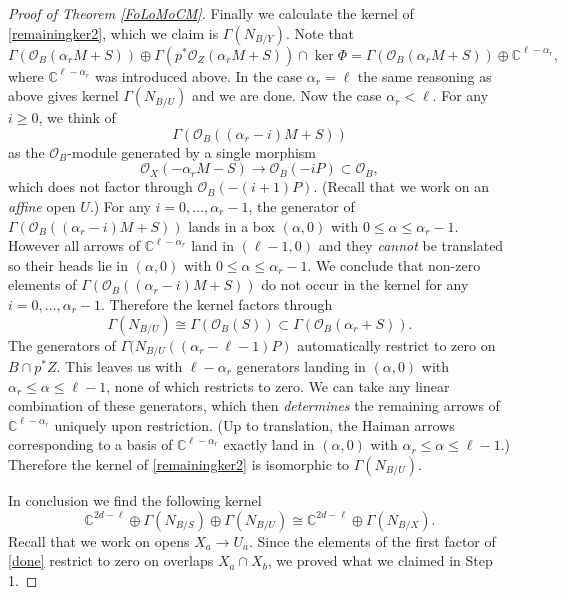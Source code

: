 \documentclass{amsart}
\theoremstyle{definition}
\newcommand{\CC} {\mathbb{C}}          %
\renewcommand{\O}{\mathcal{O}}
\begin{document}
\begin{proof}[Proof of Theorem \ref{FoLoMoCM}]
Finally we calculate the kernel of \eqref{remainingker2}, which we claim is $\Gamma(N_{B/Y})$. Note that 
\[
\Gamma(\O_B(\alpha_r M + S)) \oplus \Gamma(p^* \O_Z(\alpha_r M + S)) \cap \ker \Phi  = \Gamma(\O_B(\alpha_r M + S)) \oplus \CC^{\ell - \alpha_r},
\]
where $\CC^{\ell - \alpha_r}$ was introduced above. In the case $\alpha_r = \ell$ the same reasoning as above gives kernel $\Gamma(N_{B/U})$ and we are done. Now the case $\alpha_r < \ell$. For any $i \geq 0$, we think of
\[
\Gamma(\O_B((\alpha_r - i) M + S))
\] 
as the $\O_B$-module generated by a single morphism 
\[
\O_X(-\alpha_r M - S) \rightarrow \O_B(-i P) \subset \O_B,
\] 
which does not factor through $\O_B(-(i+1)P)$. (Recall that we work on an \emph{affine} open $U$.) For any $i=0, \ldots, \alpha_r-1$, the generator of $\Gamma(\O_B((\alpha_r - i) M + S))$ lands in a box $(\alpha,0)$ with $0 \leq \alpha \leq \alpha_r-1$. However all arrows of $\CC^{\ell - \alpha_r}$ land in $(\ell-1,0)$ and they \emph{cannot} be translated so their heads lie in $(\alpha,0)$ with $0 \leq \alpha \leq \alpha_r-1$. We conclude that non-zero elements of $\Gamma(\O_B((\alpha_r - i) M + S))$ do not occur in the kernel for any $i=0, \ldots, \alpha_r-1$. Therefore the kernel factors through
\[
\Gamma(N_{B/U}) \cong \Gamma(\O_B(S)) \subset \Gamma(\O_B(\alpha_r + S)).
\]
The generators of $\Gamma(N_{B/U}((\alpha_r-\ell-1) P)$ automatically restrict to zero on $B \cap p^*Z$. This leaves us with $\ell - \alpha_r$ generators landing in $(\alpha,0)$ with $\alpha_r \leq \alpha \leq \ell-1$, none of which restricts to zero. We can take any linear combination of these generators, which then \emph{determines} the remaining arrows of $\CC^{\ell - \alpha_r}$ uniquely upon restriction. (Up to translation, the Haiman arrows corresponding to a basis of $\CC^{\ell - \alpha_r}$ exactly land in $(\alpha,0)$ with $\alpha_r \leq \alpha \leq \ell-1$.) Therefore the kernel of \eqref{remainingker2} is isomorphic to $\Gamma(N_{B/U})$.

In conclusion we find the following kernel
\begin{equation} \label{done}
\CC^{2d - \ell} \oplus \Gamma(N_{B/S}) \oplus \Gamma(N_{B/U}) \cong \CC^{2d - \ell} \oplus \Gamma(N_{B/X}).
\end{equation}
Recall that we work on opens $X_a \rightarrow U_a$. Since the elements of the first factor of \eqref{done} restrict to zero on overlaps $X_a \cap X_b$, we proved what we claimed in Step 1. 
\end{proof}

\newpage
\end{document}
